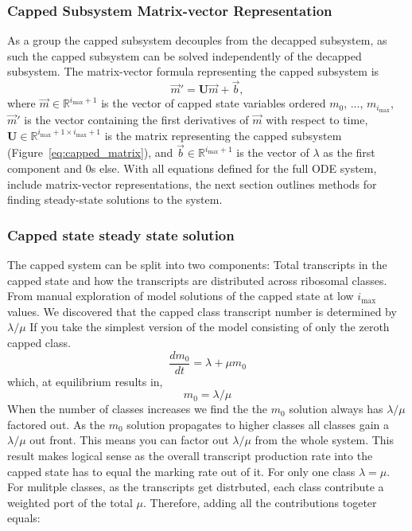 \documentclass[review]{elsarticle}
\newcommand{\imax}{\ensuremath{i_{\max}}\xspace}
\let\bs\boldsymbol
\begin{document}
\subsubsection{Capped Subsystem Matrix-vector Representation}
As a group the capped subsystem decouples from the decapped subsystem, as such the capped subsystem can be solved independently of the decapped subsystem.  
The matrix-vector formula representing the capped subsystem is \begin{equation}\label{eq:matrix_capped}\vec{m}'=\bs{U}\vec{m}+\vec{b},\end{equation} where $\vec{m}\in\mathbb{R}^{\imax+1}$ is the vector of capped state variables ordered $m_0$, ..., $m_{\imax}$, $\vec{m}'$ is the vector containing the first derivatives of $\vec{m}$ with respect to time, $\bs{U}\in\mathbb{R}^{\imax+1\times \imax+1}$ is the matrix representing the capped subsystem (Figure~\ref{eq:capped_matrix}), and $\vec{b}\in\mathbb{R}^{\imax+1}$ is the vector of $\lambda$ as the first component and 0s else.
With all equations defined for the full ODE system, include matrix-vector representations, the next section outlines methods for finding steady-state solutions to the system.

\subsubsection{Capped state steady state solution}

The capped system can be split into two components: Total transcripts in the capped state and how the transcripts are distributed across ribosomal classes. 
From manual exploration of model solutions of the capped state at low \imax values. 
We discovered that the capped class transcript number is determined by $\lambda/ \mu$
If you take the simplest version of the model consisting of only the zeroth capped class.
	\begin{equation} \label{eq:basic_capped_solution1}
		\frac{dm_{0}}{dt} = \lambda + \mu m_{0}
	\end{equation}
which, at equilibrium results in,
	\begin{equation}\label{eq:basic_capped_solution2}
		m_{0} = \lambda/\mu
	\end{equation}
When the number of classes increases we find the the $m_{0}$ solution always has $\lambda/ \mu$ factored out. As the $m_{0}$ solution propagates to higher classes all classes gain a $\lambda/ \mu$ out front.
This means you can factor out $\lambda/ \mu$ from the whole system. 
This result makes logical sense as the overall transcript production rate into the capped state has to equal the marking rate out of it. For only one class $\lambda = \mu$. 
For mulitple classes, as the transcripts get distrbuted, each class contribute a weighted port of the total $\mu$. Therefore, adding all the contributions togeter equals:
\end{document}
